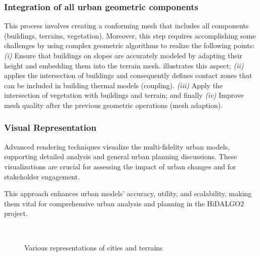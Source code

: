 \documentclass[runningheads]{llncs}
\begin{document}
\subsubsection{Integration of all urban geometric components}

This process involves creating a conforming mesh that includes all components (buildings, terrains, vegetation). Moreover, this step requires accomplishing some challenges by using complex geometric algorithms to realize the following points: \textit{(i)} Ensure that buildings on slopes are accurately modeled by adapting their height and embedding them into the terrain mesh. 
 illustrates this aspect; \textit{(ii)} applies the intersection of buildings and consequently defines contact zones that can be included in building thermal models (coupling). \textit{(iii)} Apply the intersection of vegetation with buildings and terrain; and finally \textit{(iv)} Improve mesh quality after the previous geometric operations (mesh adaption).


\subsubsection{Visual Representation}
Advanced rendering techniques visualize the multi-fidelity urban models, supporting detailed analysis and general urban planning discussions.
These visualizations are crucial for assessing the impact of urban changes and for stakeholder engagement.

This approach enhances urban models' accuracy, utility, and scalability, making them vital for comprehensive urban analysis and planning in the HiDALGO2 project.

\begin{figure}[ht]
\centering
{}
\hfill %
\\ %


\caption{Various representations of cities and terrains}
\label{fig:city-strasbourg}
\vspace{-0.5cm}
\end{figure}
\end{document}
